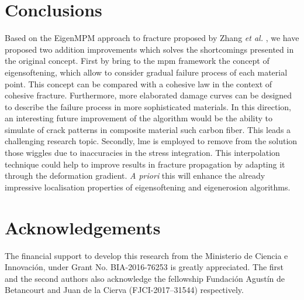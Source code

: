 \message{ !name(2020_EFM_MPM_Eigensoftening.tex)}\documentclass[preprint,12pt,a4paper]{elsarticle}
\begin{document}
\section{Conclusions}
\label{sec:4}
Based on the EigenMPM approach to fracture proposed by Zhang {\it et al.}
\cite{Zhang_EE_2020}, we have proposed two addition improvements which
solves the shortcomings presented in the original concept. First by
bring to the \acrshort{mpm} framework the concept of eigensoftening,
which allow to consider gradual failure process of each material
point. This concept can be compared with a cohesive law in the context
of cohesive fracture. Furthermore, more elaborated damage curves can
be designed to describe the failure process in more sophisticated
materials. In this direction, an interesting future improvement of the
algorithm would be the ability to simulate of crack patterns in
composite material such carbon fiber. This leads a challenging
research topic. Secondly, \acrshort{lme} is employed to remove from
the solution those wiggles due to inaccuracies in the stress
integration. This interpolation technique could help to improve
results in fracture propagation by adapting it through the
deformation gradient. \textit{A priori} this will enhance the already
impressive localisation properties of eigensoftening and eigenerosion
algorithms. 

\section*{Acknowledgements}
The financial support to develop this research from the Ministerio de
Ciencia e Innovaci\'on, under Grant No. BIA-2016-76253 is greatly
appreciated. The first and the second authors also acknowledge the
fellowship Fundaci\'on Agust\'in de Betancourt and Juan de la Cierva
(FJCI-2017–31544) respectively.

\appendix
\end{document}
